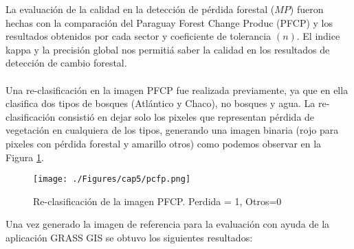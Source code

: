 La evaluaci\'on de la calidad en la detecci\'on de p\'erdida forestal ($ MP $) fueron hechas con la comparaci\'on del Paraguay Forest Change Produc (PFCP) y los resultados obtenidos por cada sector y coeficiente de tolerancia $ (n) $. El indice kappa y la precisi\'on global nos permiti\'a saber la calidad en los resultados de detecci\'on de cambio forestal.\\~\\
Una re-clasificaci\'on en la imagen PFCP fue realizada previamente, ya que en ella clasifica dos tipos de bosques (Atl\'antico y Chaco), no bosques y agua. La re-clasificaci\'on consisti\'o en dejar solo los pixeles que representan p\'erdida de vegetaci\'on en cualquiera de los tipos, generando una imagen binaria (rojo para pixeles con p\'erdida forestal y amarillo otros) como podemos observar en la Figura \ref{fig:pfcp}.
\begin{figure}[H]
	\centering
	\texttt{[image: ./Figures/cap5/pcfp.png]}
	\caption{Re-clasificaci\'on de la imagen PFCP. Perdida = 1, Otros=0}
	\label{fig:pfcp}
\end{figure}
Una vez generado la imagen de referencia para la evaluaci\'on con ayuda de la aplicaci\'on GRASS GIS se obtuvo los siguientes resultados:

